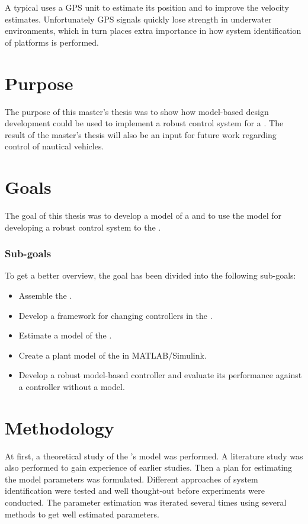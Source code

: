 A typical \abbrUV uses a GPS unit to estimate its position and to improve the velocity estimates. Unfortunately GPS signals quickly lose strength in underwater environments, which in turn places extra importance in how system identification of \abbrROV platforms is performed.


\section{Purpose}
The purpose of this master's thesis was to show how model-based design development could be used to implement a robust control system for a \abbrROV. The result of the master's thesis will also be an input for future work regarding control of nautical vehicles. 


\section{Goals}
The goal of this thesis was to develop a model of a \abbrROV and to use the model for developing a robust control system to the \abbrROV.

\subsubsection{Sub-goals}
To get a better overview, the goal has been divided into the following sub-goals:
\begin{itemize}
    \item Assemble the \abbrROV.
    \item Develop a framework for changing controllers in the \abbrROV.
    \item Estimate a model of the \abbrROV.
    \item Create a plant model of the \abbrROV in MATLAB/Simulink.
    \item Develop a robust model-based controller and evaluate its performance against a controller without a model.
\end{itemize}

\section{Methodology}
At first, a theoretical study of the \abbrROV's model was performed. A literature study was also performed to gain experience of earlier studies. Then a plan for estimating the model parameters was formulated. Different approaches of system identification were tested and well thought-out before experiments were conducted. The parameter estimation was iterated several times using several methods to get well estimated parameters. 

